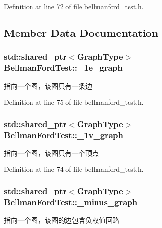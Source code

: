 Definition at line 72 of file bellmanford\+\_\+test.\+h.



\subsection{Member Data Documentation}
\hypertarget{class_bellman_ford_test_a13720ba4e090b0accf73283c15a7f0ec}{}
\subsubsection[{\+\_\+1e\+\_\+graph}]{\setlength{\rightskip}{0pt plus 5cm}std\+::shared\+\_\+ptr$<${\bf Graph\+Type}$>$ Bellman\+Ford\+Test\+::\+\_\+1e\+\_\+graph\hspace{0.3cm}{\ttfamily [protected]}}\label{class_bellman_ford_test_a13720ba4e090b0accf73283c15a7f0ec}
指向一个图，该图只有一条边 

Definition at line 75 of file bellmanford\+\_\+test.\+h.

\hypertarget{class_bellman_ford_test_a1e228fdc8f10f3932dfa93969b22740a}{}
\subsubsection[{\+\_\+1v\+\_\+graph}]{\setlength{\rightskip}{0pt plus 5cm}std\+::shared\+\_\+ptr$<${\bf Graph\+Type}$>$ Bellman\+Ford\+Test\+::\+\_\+1v\+\_\+graph\hspace{0.3cm}{\ttfamily [protected]}}\label{class_bellman_ford_test_a1e228fdc8f10f3932dfa93969b22740a}
指向一个图，该图只有一个顶点 

Definition at line 74 of file bellmanford\+\_\+test.\+h.

\hypertarget{class_bellman_ford_test_a179a0a6d2ae9d6a2404ef5e5f9a06869}{}
\subsubsection[{\+\_\+minus\+\_\+graph}]{\setlength{\rightskip}{0pt plus 5cm}std\+::shared\+\_\+ptr$<${\bf Graph\+Type}$>$ Bellman\+Ford\+Test\+::\+\_\+minus\+\_\+graph\hspace{0.3cm}{\ttfamily [protected]}}\label{class_bellman_ford_test_a179a0a6d2ae9d6a2404ef5e5f9a06869}
指向一个图，该图的边包含负权值回路 

